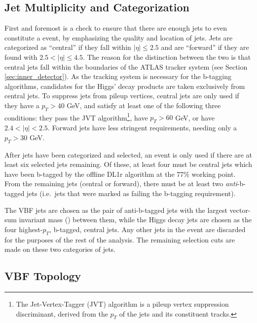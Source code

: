             


    \FloatBarrier
    \subsection{Jet Multiplicity and Categorization}
        
        First and foremost is a check to ensure that there are enough jets to even constitute a \vbfproc event,
            by emphasizing the quality and location of jets.
        Jets are categorized as ``central'' if they fall within $|\eta| \leq 2.5$
            and are ``forward'' if they are found with $ 2.5 < |\eta| \leq 4.5 $.
        The reason for the distinction between the two is that central jets fall within the boundaries of the ATLAS tracker system
            (see Section \ref{sec:inner_detector}).
        As the tracking system is necessary for the b-tagging algorithms,
            candidates for the Higgs' decay products are taken exclusively from central jets.
        To suppress jets from pileup vertices, central jets are only used if they have a $p_T > 40$ GeV,
            and satisfy at least one of the following three conditions:
            they pass the JVT algorithm\footnote{
                The Jet-Vertex-Tagger (JVT) algorithm is a pileup vertex suppression discriminant,
                    derived from the $p_T$ of the jets and its constituent tracks\cite{jvt_algo}.
            }, have $p_T > 60$ GeV, or have $2.4 < |\eta| < 2.5$.
        Forward jets have less stringent requirements, needing only a $p_T > 30$ GeV.

        After jets have been categorized and selected, an event is only used if there are at least six selected jets remaining.
        Of these, at least four must be central jets which have been b-tagged by the offline DL1r algorithm at the 77\% working point.
        From the remaining jets (central or forward), there must be at least two \textit{anti}-b-tagged jets
            (i.e.\ jets that were marked as failing the b-tagging requirement).

        The VBF jets are chosen as the pair of anti-b-tagged jets with the largest vector-sum invariant mass (\mjj) between them,
            while the Higgs decay jets are chosen as the four highest-$p_T$, b-tagged, central jets.
        Any other jets in the event are discarded for the purposes of the rest of the analysis.
        The remaining selection cuts are made on these two categories of jets.
        

    \subsection{VBF Topology}

